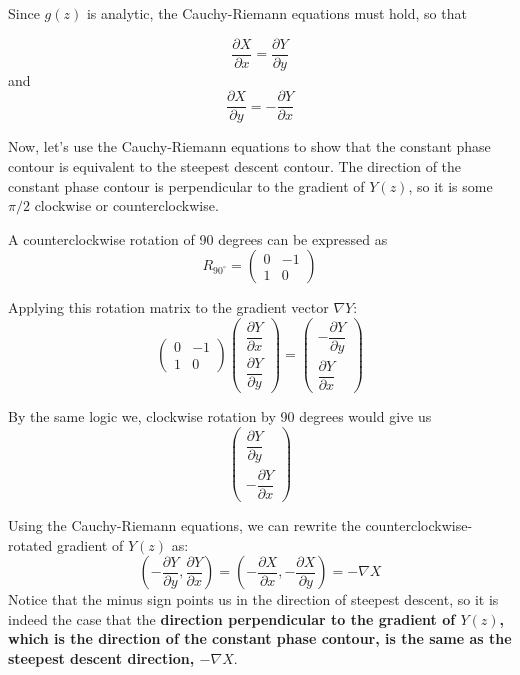 Since $g(z)$ is analytic, the Cauchy-Riemann equations must hold, so that

$$
\frac{\partial X}{\partial x} = \frac{\partial Y}{\partial y}
$$
and
$$
\frac{\partial X}{\partial y} = -\frac{\partial Y}{\partial x}
$$


Now, let's use the Cauchy-Riemann equations to show that the constant phase contour is equivalent
to the steepest descent contour.
The direction of the constant phase contour is perpendicular to the gradient of $Y(z)$, so it is
some $\pi/2$ clockwise or counterclockwise.

A counterclockwise rotation of 90 degrees can be expressed as
$$
R_{90^\circ}
= \begin{pmatrix}
    0 &  -1 \\
    1 & 0
\end{pmatrix}
$$

Applying this rotation matrix to the gradient vector $\nabla Y$:
$$
\begin{pmatrix}
    0 & -1 \\[1em]
    1 & 0
\end{pmatrix}
\begin{pmatrix}
    \dfrac{\partial Y}{\partial x} \\[1em]
    \dfrac{\partial Y}{\partial y}
\end{pmatrix}
= \begin{pmatrix}
    -\dfrac{\partial Y}{\partial y} \\[1em]
    \dfrac{\partial Y}{\partial x}
\end{pmatrix}
$$

By the same logic we, clockwise rotation by 90 degrees would give us
$$
\begin{pmatrix}
    \dfrac{\partial Y}{\partial y} \\[1em]
    -\dfrac{\partial Y}{\partial x}
\end{pmatrix}
$$


Using the Cauchy-Riemann equations, we can rewrite the counterclockwise-rotated gradient of $Y(z)$ as:
$$
\left( -\frac{\partial Y}{\partial y}, \frac{\partial Y}{\partial x}\right)
= \left(-\frac{\partial X}{\partial x}, -\frac{\partial X}{\partial y}\right) = -\nabla X
$$
Notice that the minus sign points us in the direction of steepest descent,
so it is indeed the case that the \textbf{direction perpendicular to the gradient of $Y(z)$,
which is the direction of the constant phase contour,
is the same as the steepest descent direction, $-\nabla X$}.







